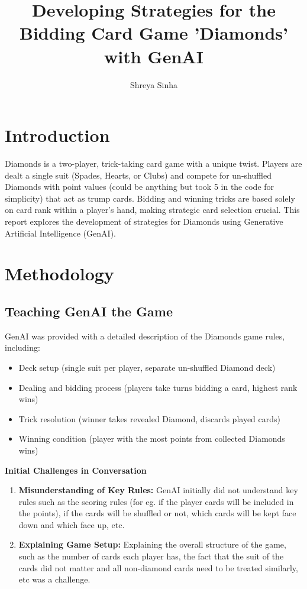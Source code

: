 \documentclass{article}
\title{Developing Strategies for the Bidding Card Game 'Diamonds' with GenAI}
\author{Shreya Sinha}
\begin{document}
\maketitle

\section{Introduction}

Diamonds is a two-player, trick-taking card game with a unique twist. Players are dealt a single suit (Spades, Hearts, or Clubs) and compete for un-shuffled Diamonds with point values (could be anything but took 5 in the code for simplicity) that act as trump cards. Bidding and winning tricks are based solely on card rank within a player's hand, making strategic card selection crucial. This report explores the development of strategies for Diamonds using Generative Artificial Intelligence (GenAI).

\section{Methodology}
\subsection{Teaching GenAI the Game}

GenAI was provided with a detailed description of the Diamonds game rules, including:
\begin{itemize}
    \item Deck setup (single suit per player, separate un-shuffled Diamond deck)
    \item Dealing and bidding process (players take turns bidding a card, highest rank wins)
    \item Trick resolution (winner takes revealed Diamond, discards played cards)
    \item Winning condition (player with the most points from collected Diamonds wins)
\end{itemize}
\textbf{Initial Challenges in Conversation}
\begin{enumerate}
    \item \textbf{Misunderstanding of Key Rules:} GenAI initially did not understand key rules such as the scoring rules (for eg. if the player cards will be included in the points), if the cards will be shuffled or not, which cards will be kept face down and which face up, etc.
    \item \textbf{Explaining Game Setup:} Explaining the overall structure of the game, such as the number of cards each player has, the fact that the suit of the cards did not matter and all non-diamond cards need to be treated similarly, etc was a challenge.
\end{enumerate}
\end{document}
